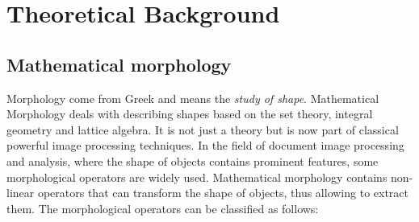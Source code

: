 
\graphicspath{ {3chapterTheory/image/} }
\chapter{Theoretical Background}
\section{Mathematical morphology} \label{MM}
Morphology come from Greek and means the \textit{study of shape}. Mathematical Morphology deals with describing shapes based on the set theory, integral geometry and lattice algebra. It is not just a theory but is now part of classical powerful image processing techniques. In the field of document image processing and analysis, where the shape of objects contains prominent features, some morphological operators are widely used. Mathematical morphology contains non-linear operators that can transform the shape of objects, thus allowing to extract them. The morphological operators can be classified as follows:
